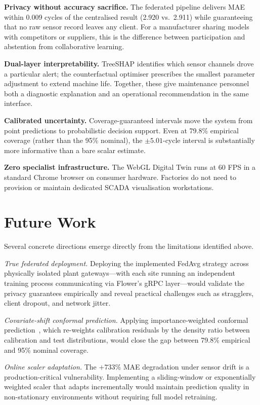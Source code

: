 \documentclass[10pt, journal, letterpaper]{IEEEtran}
\begin{document}
\textbf{Privacy without accuracy sacrifice.} The federated pipeline delivers
MAE within 0.009 cycles of the centralised result (2.920 vs.\ 2.911) while
guaranteeing that no raw sensor record leaves any client. For a manufacturer
sharing models with competitors or suppliers, this is the difference between
participation and abstention from collaborative learning.

\textbf{Dual-layer interpretability.} TreeSHAP identifies which sensor channels
drove a particular alert; the counterfactual optimiser prescribes the smallest
parameter adjustment to extend machine life. Together, these give maintenance
personnel both a diagnostic explanation and an operational recommendation in
the same interface.

\textbf{Calibrated uncertainty.} Coverage-guaranteed intervals move the system
from point predictions to probabilistic decision support. Even at 79.8\%
empirical coverage (rather than the 95\% nominal), the $\pm 5.01$-cycle interval
is substantially more informative than a bare scalar estimate.

\textbf{Zero specialist infrastructure.} The WebGL Digital Twin runs at 60 FPS
in a standard Chrome browser on consumer hardware. Factories do not need to
provision or maintain dedicated SCADA visualisation workstations.

\section{Future Work}
\label{sec:future}

Several concrete directions emerge directly from the limitations identified above.

\textit{True federated deployment.} Deploying the implemented FedAvg strategy
across physically isolated plant gateways—with each site running an independent
training process communicating via Flower's gRPC layer—would validate the
privacy guarantees empirically and reveal practical challenges such as
stragglers, client dropout, and network jitter.

\textit{Covariate-shift conformal prediction.} Applying importance-weighted
conformal prediction~\cite{angelopoulos2021}, which re-weights calibration
residuals by the density ratio between calibration and test distributions,
would close the gap between 79.8\% empirical and 95\% nominal coverage.

\textit{Online scaler adaptation.} The $+733\%$ MAE degradation under sensor
drift is a production-critical vulnerability. Implementing a sliding-window
or exponentially weighted scaler that adapts incrementally would maintain
prediction quality in non-stationary environments without requiring full
model retraining.
\end{document}
